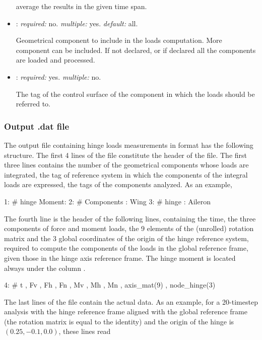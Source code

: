 \begin{itemize}
average the results in the given time span.

\item {}: \textit{required:} no. \textit{multiple:} yes. \textit{default:} all.

Geometrical component to include in the loads computation. More component can be included. If not declared, or if declared  all the components are loaded and processed. 

\item {}: \textit{required:} yes. \textit{multiple:} no.

The tag of the control surface of the component in which the loads should be referred to. 

\end{itemize}

\subsubsection{Output .dat file}
The output file containing hinge loads measurements in  format has the following structure.
The first 4 lines of the file constitute the header of the file. The first three lines contains the number of the geometrical components  whose loads are integrated, the tag of reference system in which the components of the integral loads are expressed, the tags of the  components analyzed. As an example,
\begin{inputfile}
 1: # hinge Moment: 
 2: #               Components  : Wing
 3: #                    hinge  : Aileron
\end{inputfile}
The fourth line is the header of the following lines, containing the time, the three components of force and moment loads, the 9 elements of the (unrolled) rotation matrix and the 3 global coordinates of the origin of the hinge reference system, required to compute the components of the loads in the global reference frame, given those in the hinge axis reference frame. The hinge moment is located always under the column . 
\begin{inputfile}
 4: #  t , Fv , Fh , Fn , Mv , Mh , Mn , axis_mat(9) , node_hinge(3) 
\end{inputfile}
The last lines of the file contain the actual data. As an example, for a 20-timestep analysis with the hinge  reference frame  aligned with the global reference frame (the rotation matrix is equal to the identity) and the origin of the hinge is $(0.25,-0.1,0.0)$, these lines read
